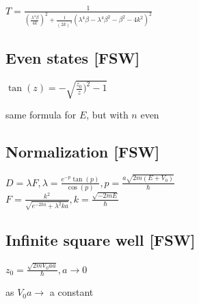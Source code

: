 \documentclass{article}
\newcommand{\<}{\langle}
\renewcommand{\>}{\rangle}
\begin{document}
$T = \frac{1}{(\frac{\lambda^4\beta}{4k})^2 + \frac{1}{(2k)^4}(\lambda^4\beta - \lambda^4\beta^2 - \beta^2 - 4k^2)^2}$

\subsection{Even states [FSW]}

$\tan(z) = -\sqrt{\frac{z_0}{z})^2 - 1}$

same formula for $E$, but with $n$ even

\subsection{Normalization [FSW]}

$D = \lambda F, \lambda = \frac{e^{-p}\tan(p)}{\cos(p)}, p = \frac{a\sqrt{2m(E+V_0)}}{\hbar}$
\\
$F = \frac{k^2}{\sqrt{e^{-2ka} + \lambda^2ka}}, k = \frac{\sqrt{-2mE}}{\hbar}$

\subsection{Infinite square well [FSW]}

$z_0 = \frac{\sqrt{2mV_0aa}}{\hbar}, a \rightarrow 0$

as $V_0a \rightarrow$ a constant
\end{document}
